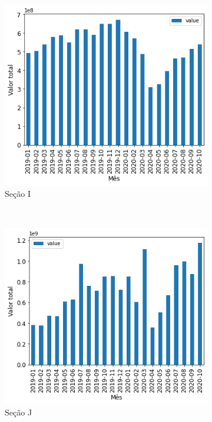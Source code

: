 \begin{figure}[htb]
\begin{subfigure}[b]{0.45\textwidth}
    \end{subfigure} ~ \\
    \begin{subfigure}[b]{0.45\textwidth}
        \includegraphics[scale=0.45]{images/base-de-dados-16.I-valor-mensal-por-secao.png}
        \caption{Seção I}
        \label{fig:pandemia:descritiva-16.I-valor-mensal-por-secao}
    \end{subfigure} ~ \quad
    \begin{subfigure}[b]{0.45\textwidth}
        \includegraphics[scale=0.45]{images/base-de-dados-16.J-valor-mensal-por-secao.png}
        \caption{Seção J}
        \label{fig:pandemia:descritiva-16.J-valor-mensal-por-secao}
    \end{subfigure} ~ \\
    \begin{subfigure}[b]{0.45\textwidth} 

\end{subfigure}
\end{figure}
